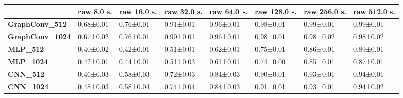 \begin{tabular}{llllllll}
\toprule
{} & raw 8.0 s. & raw 16.0 s. & raw 32.0 s. & raw 64.0 s. & raw 128.0 s. & raw 256.0 s. & raw 512.0 s. \\
\midrule
\textbf{GraphConv\_512 } &  0.68±0.01 &   0.76±0.01 &   0.91±0.01 &   0.96±0.01 &    0.98±0.01 &    0.99±0.01 &    0.99±0.01 \\
\textbf{GraphConv\_1024} &  0.67±0.02 &   0.76±0.01 &   0.90±0.01 &   0.96±0.01 &    0.98±0.01 &    0.98±0.02 &    0.98±0.02 \\
\textbf{MLP\_512       } &  0.40±0.02 &   0.42±0.01 &   0.51±0.01 &   0.62±0.01 &    0.75±0.01 &    0.86±0.01 &    0.89±0.01 \\
\textbf{MLP\_1024      } &  0.42±0.01 &   0.44±0.01 &   0.51±0.03 &   0.61±0.01 &    0.74±0.00 &    0.85±0.01 &    0.87±0.01 \\
\textbf{CNN\_512       } &  0.46±0.03 &   0.58±0.03 &   0.72±0.03 &   0.84±0.03 &    0.90±0.01 &    0.93±0.01 &    0.94±0.01 \\
\textbf{CNN\_1024      } &  0.48±0.03 &   0.58±0.04 &   0.74±0.04 &   0.84±0.03 &    0.91±0.01 &    0.93±0.01 &    0.94±0.02 \\
\bottomrule
\end{tabular}
